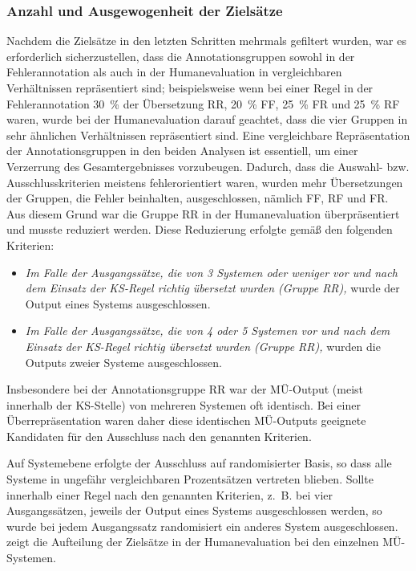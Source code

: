 \subsubsection{\label{sec:4.4.3.2}Anzahl und Ausgewogenheit der Zielsätze}

Nachdem die Zielsätze in den letzten Schritten mehrmals gefiltert wurden, war es erforderlich sicherzustellen, dass die Annotationsgruppen sowohl in der Fehlerannotation als auch in der Humanevaluation in vergleichbaren Verhältnissen repräsentiert sind; beispielsweise wenn bei einer Regel in der Fehlerannotation 30~\% der Übersetzung RR, 20~\% FF, 25~\% FR und 25~\% RF waren, wurde bei der Humanevaluation darauf geachtet, dass die vier Gruppen in sehr ähnlichen Verhältnissen repräsentiert sind. Eine vergleichbare Repräsentation der Annotationsgruppen in den beiden Analysen ist essentiell, um einer Verzerrung des Gesamtergebnisses vorzubeugen. Dadurch, dass die Auswahl- bzw. Ausschlusskriterien meistens fehlerorientiert waren, wurden mehr Übersetzungen der Gruppen, die Fehler beinhalten, ausgeschlossen, nämlich FF, RF und FR. Aus diesem Grund war die Gruppe RR in der Humanevaluation überpräsentiert und musste reduziert werden. Diese Reduzierung erfolgte gemäß den folgenden Kriterien:

\begin{itemize}
\item \textit{Im Falle der Ausgangssätze, die von 3 Systemen oder weniger vor und nach dem Einsatz der KS-Regel richtig übersetzt wurden (Gruppe RR),} wurde der Output eines Systems ausgeschlossen.
\item \textit{Im Falle der Ausgangssätze, die von 4 oder 5 Systemen vor und nach dem Einsatz der KS-Regel richtig übersetzt wurden (Gruppe RR),} wurden die Outputs zweier Systeme ausgeschlossen.
\end{itemize}

Insbesondere bei der Annotationsgruppe RR war der MÜ-Output (meist innerhalb der KS-Stelle) von mehreren Systemen oft identisch. Bei einer Überrepräsentation waren daher diese identischen MÜ-Outputs geeignete Kandidaten für den Ausschluss nach den genannten Kriterien.

Auf Systemebene erfolgte der Ausschluss auf randomisierter Basis, so dass alle Systeme in ungefähr vergleichbaren Prozentsätzen vertreten blieben. Sollte innerhalb einer Regel nach den genannten Kriterien, z.~B. bei vier Ausgangssätzen, jeweils der Output eines Systems ausgeschlossen werden, so wurde bei jedem Ausgangssatz randomisiert ein anderes System ausgeschlossen.  zeigt die Aufteilung der Zielsätze in der Humanevaluation bei den einzelnen MÜ-Systemen.


